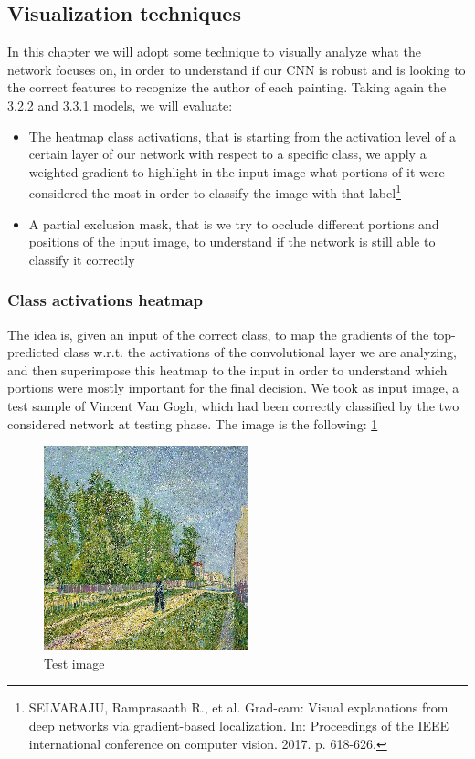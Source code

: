 \subsection{Visualization techniques}
In this chapter we will adopt some technique to visually analyze what the network focuses on, in order to understand if our CNN is robust and is looking to the correct features to recognize the author of each painting. Taking again the 3.2.2 and 3.3.1 models, we will evaluate:
\begin{itemize}
\item The heatmap class activations, that is starting from the activation level of a certain layer of our network with respect to a specific class, we apply a weighted gradient to highlight in the input image what portions of it were considered the most in order to classify the image with that label\footnote{SELVARAJU, Ramprasaath R., et al. Grad-cam: Visual explanations from deep networks via gradient-based localization. In: Proceedings of the IEEE international conference on computer vision. 2017. p. 618-626.}
\item A partial exclusion mask, that is we try to occlude different portions and positions of the input image, to understand if the network is still able to classify it correctly
\end{itemize} 

\subsubsection{Class activations heatmap}
The idea is, given an input of the correct class, to map the gradients of the top-predicted class w.r.t. the activations of the convolutional layer we are analyzing, and then superimpose this heatmap to the input in order to understand which portions were mostly important for the final decision.
We took as input image, a test sample of Vincent Van Gogh, which had been correctly classified by the two considered network at testing phase. The image is the following: \ref{fig: Test_image_visualization}


\begin{figure}[H]
	\centering
	\includegraphics[height=0.6\textwidth]{img/scratch/visualization/test_image.png}
	\caption{Test image}
	\label{fig: Test_image_visualization}
\end{figure}

